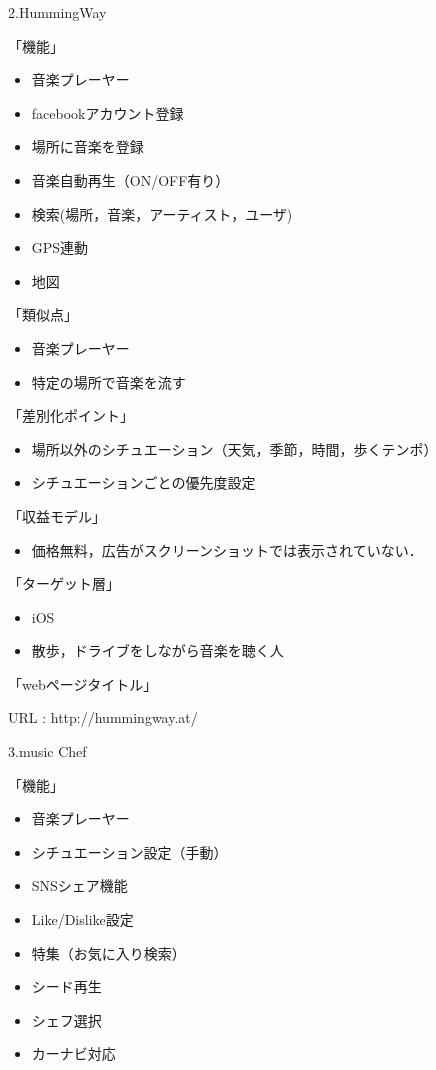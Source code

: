 \par
2.HummingWay
\par
「機能」
\begin{itemize}
\item 音楽プレーヤー
\item facebookアカウント登録
\item 場所に音楽を登録
\item 音楽自動再生（ON/OFF有り）
\item 検索(場所，音楽，アーティスト，ユーザ)
\item GPS連動
\item 地図
\end{itemize}

「類似点」
\begin{itemize}
\item 音楽プレーヤー
\item 特定の場所で音楽を流す
\end{itemize}

「差別化ポイント」
\begin{itemize}
\item 場所以外のシチュエーション（天気，季節，時間，歩くテンポ）
\item シチュエーションごとの優先度設定
\end{itemize}

「収益モデル」
\begin{itemize}
\item 価格無料，広告がスクリーンショットでは表示されていない．
\end{itemize}

「ターゲット層」
\begin{itemize}
\item iOS
\item 散歩，ドライブをしながら音楽を聴く人
\end{itemize}
「webページタイトル」
\par
URL : http://hummingway.at/

\par
3.music Chef
\par
「機能」
\begin{itemize}
\item 音楽プレーヤー
\item シチュエーション設定（手動）
\item SNSシェア機能
\item Like/Dislike設定
\item 特集（お気に入り検索）
\item シード再生
\item シェフ選択
\item カーナビ対応
\end{itemize}

